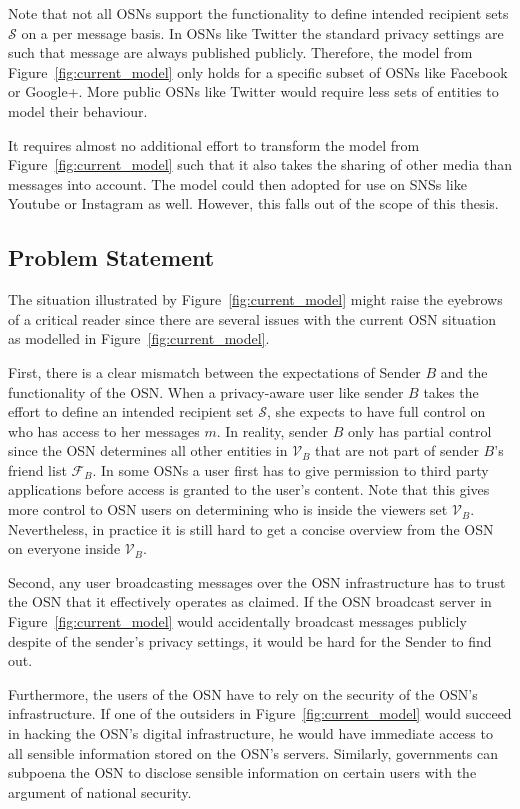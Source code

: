 Note that not all OSNs support the functionality to define intended recipient sets $\mathcal{S}$ on a per message basis. In OSNs like Twitter the standard privacy settings are such that message are always published publicly. Therefore, the model from Figure~\ref{fig:current_model} only holds for a specific subset of OSNs like Facebook or Google+. More public OSNs like Twitter would require less sets of entities to model their behaviour.

It requires almost no additional effort to transform the model from Figure~\ref{fig:current_model} such that it also takes the sharing of other media than messages into account. The model could then adopted for use on SNSs like Youtube or Instagram as well. However, this falls out of the scope of this thesis.

\subsection{Problem Statement}
\label{sec:problem_statement}
The situation illustrated by Figure~\ref{fig:current_model} might raise the eyebrows of a critical reader since there are several issues with the current OSN situation as modelled in Figure~\ref{fig:current_model}.

First, there is a clear mismatch between the expectations of Sender $B$ and the functionality of the OSN. When a privacy-aware user like sender $B$ takes the effort to define an intended recipient set $\mathcal{S}$, she expects to have full control on who has access to her messages $m$. In reality, sender $B$ only has partial control since the OSN determines all other entities in $\mathcal{V}_B$ that are not part of sender $B$'s friend list $\mathcal{F}_B$. In some OSNs a user first has to give permission to third party applications before access is granted to the user's content. Note that this gives more control to OSN users on determining who is inside the viewers set $\mathcal{V}_B$. Nevertheless, in practice it is still hard to get a concise overview from the OSN on everyone inside $\mathcal{V}_B$.

Second, any user broadcasting messages over the OSN infrastructure has to trust the OSN that it effectively operates as claimed. If the OSN broadcast server in Figure~\ref{fig:current_model} would accidentally broadcast messages publicly despite of the sender's privacy settings, it would be hard for the Sender to find out.

Furthermore, the users of the OSN have to rely on the security of the OSN's infrastructure. If one of the outsiders in Figure~\ref{fig:current_model} would succeed in hacking the OSN's digital infrastructure, he would have immediate access to all sensible information stored on the OSN's servers. Similarly, governments can subpoena the OSN to disclose sensible information on certain users with the argument of national security.

